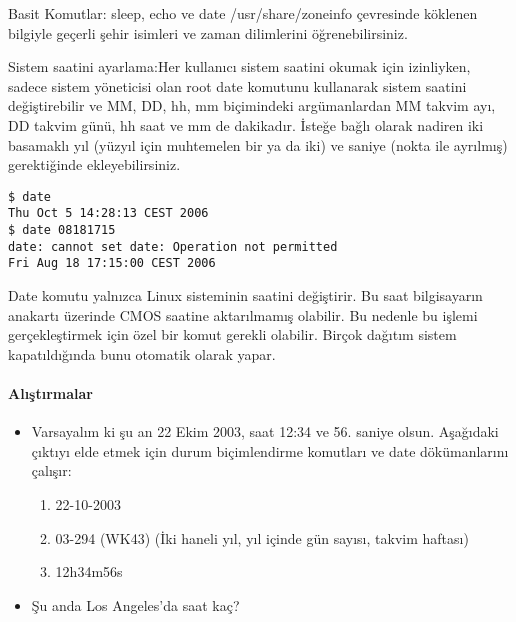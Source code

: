 \begin{section}{Basit Komutlar: sleep, echo ve date}
/usr/share/zoneinfo çevresinde köklenen bilgiyle geçerli şehir isimleri ve zaman dilimlerini öğrenebilirsiniz.

Sistem saatini ayarlama:Her kullanıcı sistem saatini okumak için izinliyken, sadece sistem yöneticisi olan root date komutunu kullanarak sistem saatini değiştirebilir ve MM, DD, hh, mm biçimindeki argümanlardan MM takvim ayı, DD takvim günü, hh saat ve mm de dakikadır. İsteğe bağlı olarak nadiren iki basamaklı yıl (yüzyıl için muhtemelen bir ya da iki) ve saniye (nokta ile ayrılmış) gerektiğinde ekleyebilirsiniz.
\begin{verbatim}
$ date
Thu Oct 5 14:28:13 CEST 2006
$ date 08181715
date: cannot set date: Operation not permitted
Fri Aug 18 17:15:00 CEST 2006
\end{verbatim}

Date komutu yalnızca Linux sisteminin saatini değiştirir. Bu saat bilgisayarın anakartı üzerinde CMOS saatine aktarılmamış olabilir. Bu nedenle bu işlemi
gerçekleştirmek için özel bir komut gerekli olabilir. Birçok dağıtım sistem kapatıldığında bunu otomatik olarak yapar.

\paragraph{Alıştırmalar}{
\begin{itemize}
\item Varsayalım ki şu an 22 Ekim 2003, saat 12:34 ve 56. saniye olsun. Aşağıdaki çıktıyı elde etmek için durum biçimlendirme komutları ve date dökümanlarını
çalışır:
\begin{enumerate}
\item 22-10-2003
\item 03-294 (WK43)  (İki haneli yıl, yıl içinde gün sayısı, takvim haftası)
\item 12h34m56s
\end{enumerate}
\item Şu anda Los Angeles’da saat kaç?
\end{itemize}}
\end{section}
